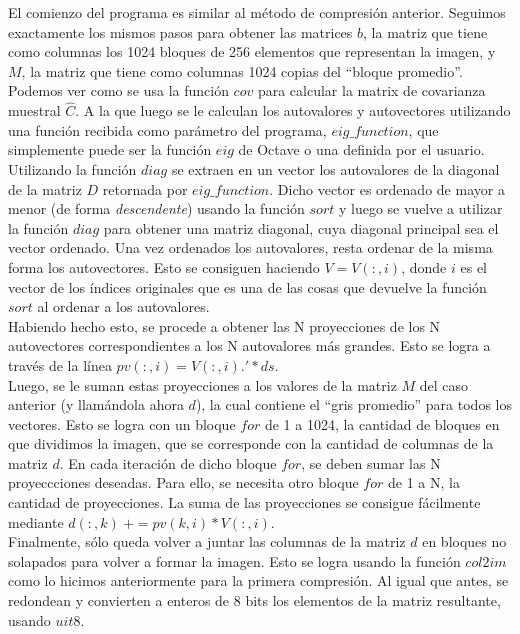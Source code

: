 \documentclass[twocolumn,a4paper,10pt]{article}
\begin{document}
El comienzo del programa es similar al m\'etodo de compresi\'on anterior. Seguimos exactamente los mismos pasos para obtener las matrices $b$, la matriz que tiene como 
columnas los 1024 bloques de 256 elementos que representan la imagen, y $M$, la matriz que tiene como columnas 1024 copias del ``bloque promedio''.\\ 

Podemos ver como se usa la función $cov$ para calcular la matrix de covarianza muestral $\widehat{C}$. A la que luego se le calculan los autovalores y autovectores
utilizando una funci\'on recibida como par\'ametro del programa, $eig\_function$, que simplemente puede ser la funci\'on $eig$ de Octave o una definida por el usuario.
Utilizando la función $diag$ se extraen en un vector los autovalores de la diagonal de la matriz $D$ retornada por $eig\_function$. Dicho vector es ordenado de 
mayor a menor (de forma \textit{descendente}) usando la funci\'on $sort$ y luego se vuelve a utilizar la funci\'on $diag$ para obtener una matriz diagonal, cuya 
diagonal principal sea el vector ordenado. Una vez ordenados los autovalores, resta ordenar de la misma forma los autovectores. Esto se consiguen haciendo $V = V(:,i)$,
donde $i$ es el vector de los \'indices originales que es una de las cosas que devuelve la funci\'on $sort$ al ordenar a los autovalores.\\

Habiendo hecho esto, se procede a obtener las N proyecciones de los N autovectores correspondientes a los N autovalores más grandes. Esto se logra a través de la 
l\'inea $pv(:,i) = V(:,i).' * ds$. \\

Luego, se le suman estas proyecciones a los valores de la matriz $M$ del caso anterior (y llam\'andola ahora $d$), la cual contiene el ``gris promedio'' para todos 
los vectores. Esto se logra con un bloque $for$ de 1 a 1024, la cantidad de bloques en que dividimos la imagen, que se corresponde con la cantidad de columnas 
de la matriz $d$. En cada iteración de dicho bloque $for$, se deben sumar las N proyeccciones deseadas. Para ello, se necesita otro bloque $for$ de 1 a N, la cantidad 
de proyecciones. La suma de las proyecciones se consigue f\'acilmente mediante $d(:,k)\: += pv(k,i) * V(:,i)$. \\

Finalmente, s\'olo queda volver a juntar las columnas de la matriz $d$ en bloques no solapados para volver a formar la imagen. Esto se logra usando la funci\'on 
$col2im$ como lo hicimos anteriormente para la primera compresi\'on. Al igual que antes, se redondean y convierten a enteros de 8 bits los elementos de la matriz
resultante, usando $uit8$.\\
\end{document}

